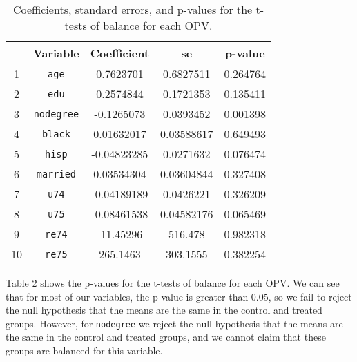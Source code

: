 \documentclass[
]{article}
\begin{document}
\begin{table}
\centering
\begin{tabular}{ccccc}
\hline
& \textbf{Variable} & \textbf{Coefficient} & \textbf{se} & \textbf{p-value} \\ \hline
1 & \texttt{age} & 0.7623701 & 0.6827511 & 0.264764 \\
2 & \texttt{edu} & 0.2574844 & 0.1721353 & 0.135411 \\
3 & \texttt{nodegree} & -0.1265073 & 0.0393452 & 0.001398 \\
4 & \texttt{black} & 0.01632017 & 0.03588617 & 0.649493 \\
5 & \texttt{hisp} & -0.04823285& 0.0271632 & 0.076474 \\
6 & \texttt{married} & 0.03534304 & 0.03604844 & 0.327408 \\
7 & \texttt{u74} & -0.04189189& 0.0426221 & 0.326209 \\
8 & \texttt{u75} & -0.08461538& 0.04582176 & 0.065469 \\
9 & \texttt{re74} & -11.45296 & 516.478 & 0.982318 \\
10 & \texttt{re75} & 265.1463 & 303.1555 & 0.382254 \\ \hline
\end{tabular}
\caption{Coefficients, standard errors, and p-values for the t-tests of balance for each OPV.}
\end{table}

Table 2 shows the p-values for the t-tests of balance for each OPV.
\newline  We can see that for most of our variables, the p-value is
greater than 0.05, so we fail to reject the null hypothesis that the
means are the same in the control and treated groups. However, for
\texttt{nodegree} we reject the null hypothesis that the means are the
same in the control and treated groups, and we cannot claim that these
groups are balanced for this variable.

\newpage
\end{document}
